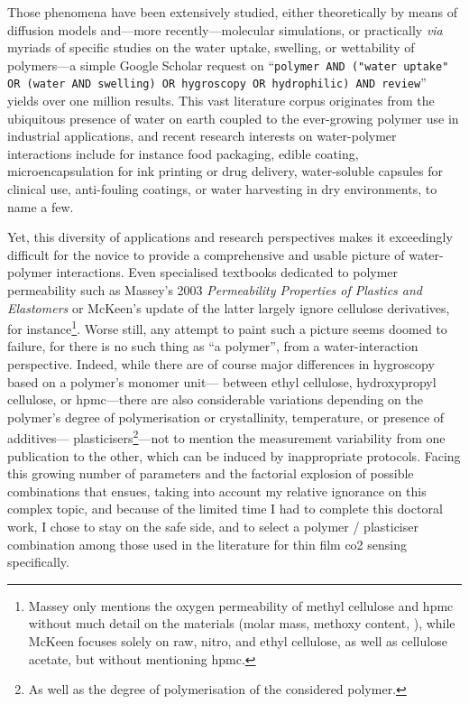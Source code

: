 Those phenomena have been extensively studied, either theoretically by means of diffusion models\cite{vanderwel1999, chapter4_solubility} and---more recently---molecular simulations\cite{kulasinski2015, kulasinski2016}, or practically \textit{via} myriads of specific studies on the water uptake, swelling, or wettability of polymers---a simple Google Scholar request on \enquote{\texttt{polymer AND ("water uptake" OR (water AND swelling) OR hygro\-scopy OR hydrophilic) AND review}} yields over one million results. This vast literature corpus originates from the ubiquitous presence of water on earth coupled to the ever-growing polymer use in industrial applications\cite[Fig. S1]{geyer2017}, and recent research interests on water-polymer interactions include for instance food packaging\cite{asim2022}, edible coating\cite{mishra2010}, microencapsulation for ink printing or drug delivery\cite{rogers2012}, water-soluble capsules for clinical use\cite{yang2020capsule}, anti-fouling coatings\cite{rana2010}, or water harvesting in dry environments\cite{guo2022}, to name a few.

Yet, this diversity of applications and research perspectives makes it exceedingly difficult for the novice to provide a comprehensive and usable picture of water-polymer interactions. Even specialised textbooks dedicated to polymer permeability such as Massey's 2003 \textit{Permeability Properties of Plastics and Elastomers}\cite{massey2003} or McKeen's update of the latter\cite{mckeen2017} largely ignore cellulose derivatives, for instance\footnote{Massey only mentions the oxygen permeability of methyl cellulose and \gls{hpmc} without much detail on the materials (molar mass, methoxy content, \etc{}), while McKeen focuses solely on raw, nitro, and ethyl cellulose, as well as cellulose acetate, but without mentioning \gls{hpmc}.}. Worse still, any attempt to paint such a picture seems doomed to failure, for there is no such thing as \enquote{a polymer}, from a water-interaction perspective. Indeed, while there are of course major differences in hygroscopy based on a polymer's monomer unit---\eg{} between ethyl cellulose, hydroxypropyl cellulose, or \gls{hpmc}\cite{patel2022_part2}---there are also considerable variations depending on the polymer's degree of polymerisation\cite{patel2022_part1, thijs2007} or crystallinity\cite{hatakeyama1998}, temperature\cite{patel2022_part1, patel2022_part2, patel2023_part3}, or presence of additives\cite{mishra2010, khwaldia2013, mahadevaiah2017}---\eg{} plasticisers\footnote{As well as the degree of polymerisation of the considered polymer\cite{aydinli2000}.}---not to mention the measurement variability from one publication to the other, which can be induced by inappropriate protocols\cite{valenzuela2011}. Facing this growing number of parameters and the factorial explosion of possible combinations that ensues, taking into account my relative ignorance on this complex topic, and because of the limited time I had to complete this doctoral work, I chose to stay on the safe side, and to select a polymer / plasticiser combination among those used in the literature for thin film \gls{co2} sensing specifically.

